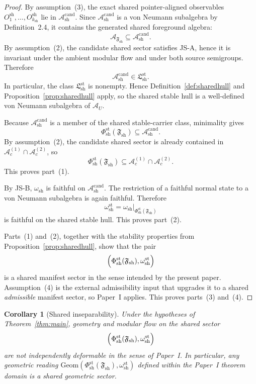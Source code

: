 \documentclass[12pt]{article}
\newtheorem{corollary}[theorem]{Corollary}
\theoremstyle{definition}
\theoremstyle{remark}
\begin{document}
\begin{proof}
By assumption~(3), the exact shared pointer-aligned observables
\(O_1^{\mathrm{sh}},\dots,O_{k_{\mathrm{sh}}}^{\mathrm{sh}}\) lie in
\(\mathcal A_{\mathrm{sh}}^{\mathrm{cand}}\). Since
\(\mathcal A_{\mathrm{sh}}^{\mathrm{cand}}\) is a von Neumann
subalgebra by Definition~2.4, it contains the generated shared
foreground algebra:
\[
\mathcal A_{\mathfrak F_{\mathrm{sh}}}
\subseteq
\mathcal A_{\mathrm{sh}}^{\mathrm{cand}}.
\]
By assumption~(2), the candidate shared sector satisfies JS-A, hence it
is invariant under the ambient modular flow and under both source
semigroups. Therefore
\[
\mathcal A_{\mathrm{sh}}^{\mathrm{cand}}
\in
\mathfrak L_{\mathrm{sh}}^{\mathrm{st}}.
\]
In particular, the class \(\mathfrak L_{\mathrm{sh}}^{\mathrm{st}}\) is
nonempty. Hence
Definition~\ref{def:sharedhull} and
Proposition~\ref{prop:sharedhull} apply, so the shared stable hull is a
well-defined von Neumann subalgebra of \(\mathcal A_U\).

Because \(\mathcal A_{\mathrm{sh}}^{\mathrm{cand}}\) is a member of the
shared stable-carrier class, minimality gives
\[
\Phi_{\mathrm{sh}}^{\mathrm{st}}(\mathfrak F_{\mathrm{sh}})
\subseteq
\mathcal A_{\mathrm{sh}}^{\mathrm{cand}}.
\]
By assumption~(2), the candidate shared sector is already contained in
\(\mathcal A_c^{(1)}\cap\mathcal A_c^{(2)}\), so
\[
\Phi_{\mathrm{sh}}^{\mathrm{st}}(\mathfrak F_{\mathrm{sh}})
\subseteq
\mathcal A_c^{(1)}\cap\mathcal A_c^{(2)}.
\]
This proves part~(1).

By JS-B, \(\omega_{\mathrm{sh}}\) is faithful on
\(\mathcal A_{\mathrm{sh}}^{\mathrm{cand}}\). The restriction of a
faithful normal state to a von Neumann subalgebra is again faithful.
Therefore
\[
\omega_{\mathrm{sh}}^{\mathrm{st}}
=
\omega_{\mathrm{sh}}|_{\Phi_{\mathrm{sh}}^{\mathrm{st}}(\mathfrak F_{\mathrm{sh}})}
\]
is faithful on the shared stable hull. This proves part~(2).

Parts~(1) and~(2), together with the stability properties from
Proposition~\ref{prop:sharedhull}, show that the pair
\[
\Bigl(
\Phi_{\mathrm{sh}}^{\mathrm{st}}(\mathfrak F_{\mathrm{sh}}),
\omega_{\mathrm{sh}}^{\mathrm{st}}
\Bigr)
\]
is a shared manifest sector in the sense intended by the present paper.
Assumption~(4) is the external admissibility input that upgrades it to a
shared \emph{admissible} manifest sector, so Paper~I applies. This
proves parts~(3) and~(4).
\end{proof}

\begin{corollary}[Shared inseparability]
\label{cor:sharedinseparability}
Under the hypotheses of Theorem~\ref{thm:main}, geometry and modular
flow on the shared sector
\[
\Bigl(
\Phi_{\mathrm{sh}}^{\mathrm{st}}(\mathfrak F_{\mathrm{sh}}),
\omega_{\mathrm{sh}}^{\mathrm{st}}
\Bigr)
\]
are not independently deformable in the sense of Paper~I. In
particular, any geometric reading
\(\mathrm{Geom}(\Phi_{\mathrm{sh}}^{\mathrm{st}}(\mathfrak F_{\mathrm{sh}}),
\omega_{\mathrm{sh}}^{\mathrm{st}})\)
defined within the Paper~I theorem domain is a \emph{shared} geometric
sector.
\end{corollary}
\end{document}
